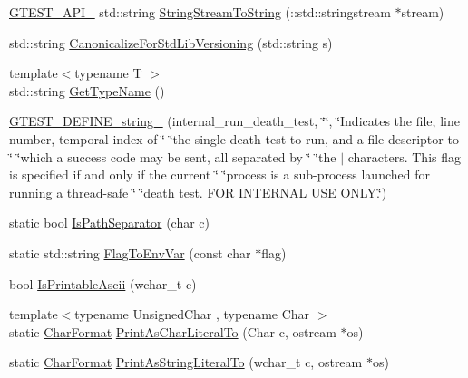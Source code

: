 \begin{DoxyCompactItemize}
\item 
\mbox{\hyperlink{gtest-port_8h_aa73be6f0ba4a7456180a94904ce17790}{G\+T\+E\+S\+T\+\_\+\+A\+P\+I\+\_\+}} std\+::string \mbox{\hyperlink{namespacetesting_1_1internal_ac0a2b7f69fc829d80a39e925b6417e39}{String\+Stream\+To\+String}} (\+::std\+::stringstream $\ast$stream)
\item 
std\+::string \mbox{\hyperlink{namespacetesting_1_1internal_a5342e843f087081705094beae07b557b}{Canonicalize\+For\+Std\+Lib\+Versioning}} (std\+::string s)
\item 
{\footnotesize template$<$typename T $>$ }\\std\+::string \mbox{\hyperlink{namespacetesting_1_1internal_a635606b4731f843c86ec8ca51cab83a1}{Get\+Type\+Name}} ()
\item 
\mbox{\hyperlink{namespacetesting_1_1internal_a20bfd9d47d8dd167ffc1c37a4c9ff73e}{G\+T\+E\+S\+T\+\_\+\+D\+E\+F\+I\+N\+E\+\_\+string\+\_\+}} (internal\+\_\+run\+\_\+death\+\_\+test, \char`\"{}\char`\"{}, \char`\"{}Indicates the file, line number, temporal index of \char`\"{} \char`\"{}the single death test to run, and a file descriptor to \char`\"{} \char`\"{}which a success code may be sent, all separated by \char`\"{} \char`\"{}the \textquotesingle{}$\vert$\textquotesingle{} characters.  This flag is specified if and only if the current \char`\"{} \char`\"{}process is a sub-\/process launched for running a thread-\/safe \char`\"{} \char`\"{}death test.  F\+OR I\+N\+T\+E\+R\+N\+AL U\+SE O\+N\+L\+Y.\char`\"{})
\item 
static bool \mbox{\hyperlink{namespacetesting_1_1internal_a6b8d22cee9edbbfe56077420a6fa1cb1}{Is\+Path\+Separator}} (char c)
\item 
static std\+::string \mbox{\hyperlink{namespacetesting_1_1internal_a7540386ecf74d7ab7e2fa6089db94682}{Flag\+To\+Env\+Var}} (const char $\ast$flag)
\item 
bool \mbox{\hyperlink{namespacetesting_1_1internal_a744a6dd74c12d1e2c16b3c03e14ed4d4}{Is\+Printable\+Ascii}} (wchar\+\_\+t c)
\item 
{\footnotesize template$<$typename Unsigned\+Char , typename Char $>$ }\\static \mbox{\hyperlink{namespacetesting_1_1internal_ae2ef98247c76a50cdc80ceb4a6c81793}{Char\+Format}} \mbox{\hyperlink{namespacetesting_1_1internal_ab73d250fde6dfbf16111afb7a071dc3f}{Print\+As\+Char\+Literal\+To}} (Char c, ostream $\ast$os)
\item 
static \mbox{\hyperlink{namespacetesting_1_1internal_ae2ef98247c76a50cdc80ceb4a6c81793}{Char\+Format}} \mbox{\hyperlink{namespacetesting_1_1internal_a8c5838995d7bb9e4232b69e6bcdb9ab8}{Print\+As\+String\+Literal\+To}} (wchar\+\_\+t c, ostream $\ast$os)

\end{DoxyCompactItemize}
